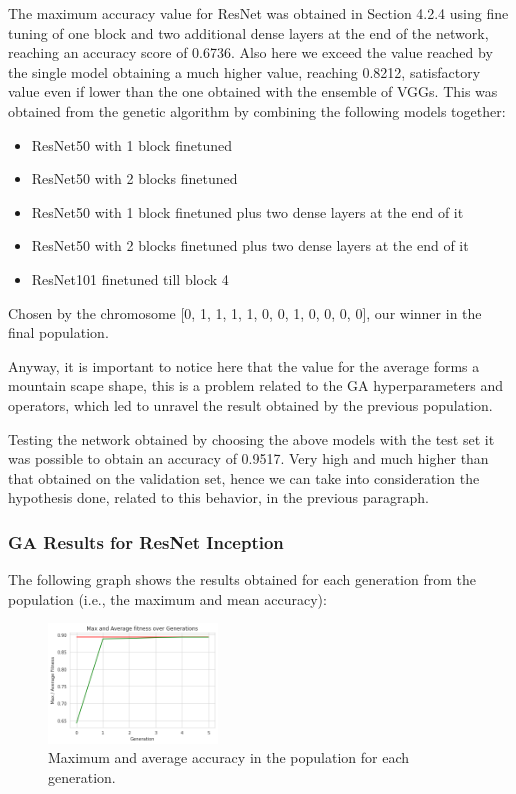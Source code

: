 The maximum accuracy value for ResNet was obtained in Section 4.2.4 using fine tuning of one block and two additional dense layers at the end of the network, reaching an accuracy score of 0.6736. Also here we exceed the value reached by the single model obtaining a much higher value, reaching 0.8212, satisfactory value even if lower than the one obtained with the ensemble of VGGs. This was obtained from the genetic algorithm by combining the following models together:
 \begin{itemize}
	\item ResNet50 with 1 block finetuned 
         \item ResNet50 with 2 blocks finetuned 
         \item ResNet50 with 1 block finetuned plus two dense layers at the end of it
         \item ResNet50 with 2 blocks finetuned plus two dense layers at the end of it
	\item ResNet101 finetuned till block 4
\end{itemize}
Chosen by the chromosome [0, 1, 1, 1, 1, 0, 0, 1, 0, 0, 0, 0], our winner in the final population.

Anyway, it is important to notice here that the value for the average forms a mountain scape shape, this is a problem related to the GA hyperparameters and operators, which led to unravel the result obtained by the previous population.

Testing the network obtained by choosing the above models with the test set it was possible to obtain an accuracy of 0.9517. Very high and much higher than that obtained on the validation set, hence we can take into consideration the hypothesis done, related to this behavior, in the previous paragraph.


\subsubsection{GA Results for ResNet Inception}
The following graph shows the results obtained for each generation from the population (i.e., the maximum and mean accuracy):

\begin{figure}[H]
	\centering
	\includegraphics[width=0.4\textwidth]{img/ensemble/inception.png}
	\caption{Maximum and average accuracy in the population for each generation.}
	\label{fig:ensembleinception}
\end{figure}


